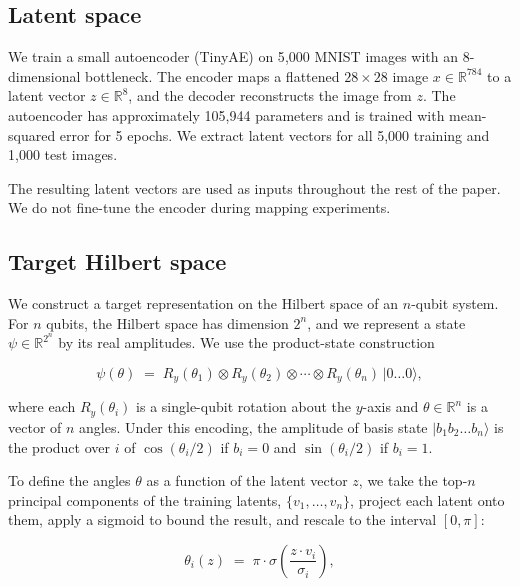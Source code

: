 \documentclass[11pt]{article}
\begin{document}
\subsection{Latent space}

We train a small autoencoder (TinyAE) on 5{,}000 MNIST images with an
8-dimensional bottleneck. The encoder maps a flattened $28 \times 28$ image
$x \in \mathbb{R}^{784}$ to a latent vector
$z \in \mathbb{R}^{8}$, and the decoder reconstructs the image from $z$.
The autoencoder has approximately 105{,}944 parameters and is trained with
mean-squared error for 5 epochs. We extract latent vectors for all 5{,}000
training and 1{,}000 test images.

The resulting latent vectors are used as inputs throughout the rest of the
paper. We do not fine-tune the encoder during mapping experiments.

\subsection{Target Hilbert space}

We construct a target representation on the Hilbert space of an $n$-qubit
system. For $n$ qubits, the Hilbert space has dimension $2^{n}$, and we
represent a state $\psi \in \mathbb{R}^{2^{n}}$ by its real amplitudes. We
use the product-state construction

\begin{equation}
\psi(\theta) \;=\; R_{y}(\theta_{1}) \otimes R_{y}(\theta_{2}) \otimes \cdots
                \otimes R_{y}(\theta_{n}) \, |0\ldots0\rangle,
\end{equation}

where each $R_{y}(\theta_{i})$ is a single-qubit rotation about the
$y$-axis and $\theta \in \mathbb{R}^{n}$ is a vector of $n$ angles. Under
this encoding, the amplitude of basis state $|b_{1} b_{2} \ldots b_{n}\rangle$
is the product over $i$ of $\cos(\theta_{i}/2)$ if $b_{i} = 0$ and
$\sin(\theta_{i}/2)$ if $b_{i} = 1$.

To define the angles $\theta$ as a function of the latent vector $z$, we
take the top-$n$ principal components of the training latents,
$\{v_{1}, \ldots, v_{n}\}$, project each latent onto them, apply a sigmoid
to bound the result, and rescale to the interval $[0, \pi]$:

\begin{equation}
\theta_{i}(z) \;=\; \pi \cdot \sigma\!\left( \frac{z \cdot v_{i}}{\sigma_{i}} \right),
\end{equation}
\end{document}
